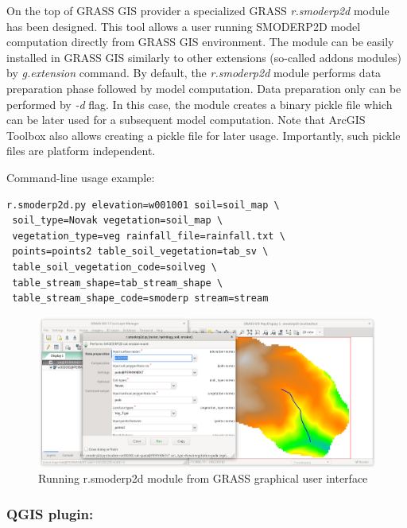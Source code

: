 On the top of GRASS GIS provider a specialized GRASS {\em r.smoderp2d}
module has been designed. This tool allows a user running SMODERP2D
model computation directly from GRASS GIS environment. The module can
be easily installed in GRASS GIS similarly to other extensions
(so-called addons modules) by {\em g.extension} command. By default,
the {\em r.smoderp2d} module performs data preparation phase followed by
model computation. Data preparation only can be performed by {\em -d}
flag. In this case, the module creates a binary pickle file which can
be later used for a subsequent model computation. Note that ArcGIS
Toolbox also allows creating a pickle file for later
usage. Importantly, such pickle files are platform independent.

Command-line usage example:
\begin{verbatim}
r.smoderp2d.py elevation=w001001 soil=soil_map \
 soil_type=Novak vegetation=soil_map \
 vegetation_type=veg rainfall_file=rainfall.txt \
 points=points2 table_soil_vegetation=tab_sv \
 table_soil_vegetation_code=soilveg \
 table_stream_shape=tab_stream_shape \
 table_stream_shape_code=smoderp stream=stream 
\end{verbatim}

\begin{figure}[ht!]
  \begin{center}
    \includegraphics[width=1.0\columnwidth]{figures/smoderp2d_grass.png}
    \caption{Running r.smoderp2d module from GRASS graphical user interface}
    \label{fig:uml_diagram}
  \end{center}
\end{figure}

\subsubsection{QGIS plugin:}

